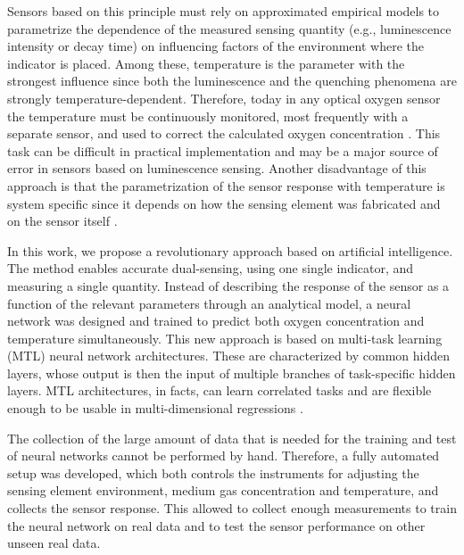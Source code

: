 \documentclass[9pt,twocolumn,twoside,pdftex]{optica}
\begin{document}
Sensors based on this principle must rely on approximated empirical models to parametrize the dependence of the measured sensing quantity (e.g., luminescence intensity or decay time) on influencing factors of the environment where the indicator is placed. Among these, temperature is the parameter with the strongest influence since both the luminescence and the quenching phenomena are strongly temperature-dependent. Therefore, today in any optical oxygen sensor the temperature must be continuously monitored, most frequently with a separate sensor, and used to correct the calculated oxygen concentration \cite{Li2015}. This task can be difficult in practical implementation and may be a major source of error in sensors based on luminescence sensing. Another disadvantage of this approach is that the parametrization of the sensor response with temperature is system specific since it depends  on how the sensing element was fabricated and on the sensor itself \cite{Xu1994,Draxler1995,Hartmann1996,Mills1998,Badocco2008,Dini2011}.

In this work, we propose a revolutionary approach based on artificial intelligence. The method enables accurate dual-sensing, using one single indicator, and measuring a single quantity.
Instead of describing the response of the sensor as a function of the relevant parameters through an analytical model, a neural network  was designed and trained to predict both oxygen concentration and temperature simultaneously.
This new approach is based on multi-task learning (MTL) neural network architectures. These are characterized by common hidden layers, whose output is then the input of multiple branches of task-specific hidden layers. MTL architectures, in facts, can learn correlated tasks \cite{Thrun1996, Caruana1997, Zhang2017, Baxter2000, Thung2018} and are flexible enough to be usable in multi-dimensional regressions \cite{Michelucci2019_2}.

The collection of the large amount of data that is needed for the training and test of neural networks cannot be performed by hand. Therefore, a fully automated setup was developed, which both controls the instruments for adjusting the sensing element environment, medium gas concentration and temperature, and collects the sensor response. This allowed to collect enough measurements to train the neural network on real data and to test the sensor performance on other unseen real data.
\end{document}
